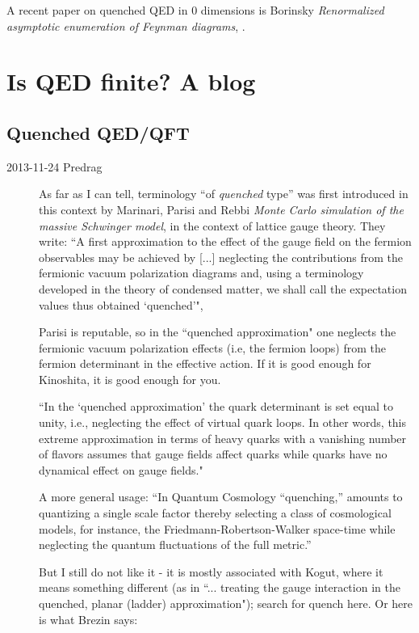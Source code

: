 \begin{description}
A recent paper on quenched QED in 0 dimensions is
Borinsky
{\em Renormalized asymptotic enumeration of {Feynman} diagrams},
.



\end{description}

\newpage
\section{Is QED finite? A blog}
\label{sect:finiteBlog}

\subsection{Quenched QED/QFT}
\label{sect:quenched QE}
\begin{description}
\item[2013-11-24  Predrag]
As far as I can tell, terminology ``of \emph{quenched} type'' was first
introduced in this context by
Marinari, Parisi and Rebbi
{\em {Monte Carlo} simulation of the massive {Schwinger} model},
in the context of lattice gauge theory. They write:
``A first approximation to the effect of the gauge field on the fermion
observables may be achieved by [...] neglecting the contributions from
the fermionic vacuum polarization diagrams and, using a terminology
developed in the theory of condensed matter, we shall call the
expectation values thus obtained `quenched'",

Parisi is reputable, so in the ``quenched approximation" one neglects
the fermionic vacuum polarization effects (i.e, the fermion loops) from
the fermion determinant in the effective action. If it is good enough for Kinoshita,
it is good enough for you.

``In the `quenched approximation' the quark determinant is set equal to
unity, i.e., neglecting the effect of virtual quark loops. In
other words, this extreme approximation in terms of heavy quarks with a
vanishing number of flavors assumes that gauge fields affect quarks while
quarks have no dynamical effect on gauge fields."

A more general usage: ``In Quantum Cosmology ``quenching,'' amounts to
quantizing a single scale factor thereby selecting a class of
cosmological models, for instance, the Friedmann-Robertson-Walker
space-time while neglecting the quantum fluctuations of the full
metric.''

But I still do not like it - it is mostly associated with Kogut, where it
means something different (as in ``... treating the gauge interaction in
the quenched, planar (ladder) approximation"); search for quench
 {here}. Or
here is what Brezin says:


\end{description}
